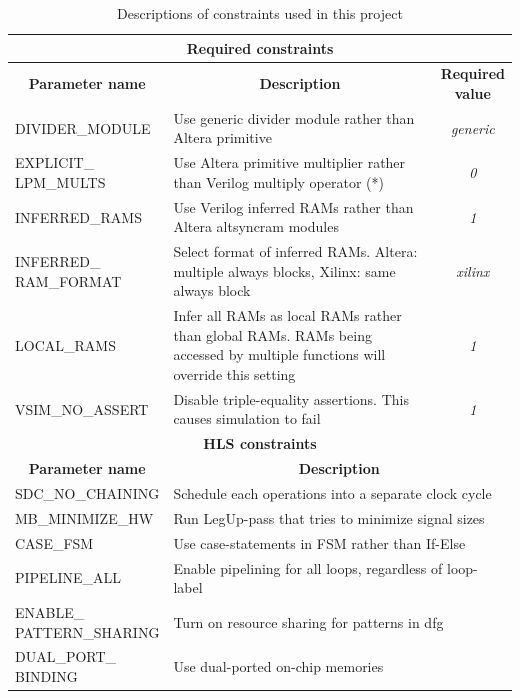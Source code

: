 \begin{table}[hbtp]
    \centering
    \begin{tabular}{l|p{6.4cm}|c}
    \multicolumn{3}{c}{\textbf{Required constraints}} \\
    \toprule
    \multicolumn{1}{c}{\textbf{Parameter name}} & \multicolumn{1}{c}{\textbf{Description}} & \specialcell{\textbf{Required}\\\textbf{value}} \\
    \midrule
    \small{DIVIDER\_MODULE} & Use generic divider module rather than Altera primitive & \textit{generic} \\
    \hline
    \specialcelll{\small{EXPLICIT\_}\\\small{LPM\_MULTS}} & Use Altera primitive multiplier rather than Verilog multiply operator (*) & \textit{0} \\
    \hline
    \small{INFERRED\_RAMS} & Use Verilog inferred RAMs rather than Altera altsyncram modules & \textit{1} \\
    \hline
    \specialcelll[t]{\small{INFERRED\_}\\\small{RAM\_FORMAT}} & Select format of inferred RAMs. Altera: multiple always blocks, Xilinx: same always block & \textit{xilinx} \\
    \hline
    \small{LOCAL\_RAMS} & Infer all RAMs as local RAMs rather than global RAMs. RAMs being accessed by multiple functions will override this setting & \textit{1} \\
    \hline
    \small{VSIM\_NO\_ASSERT} & Disable triple-equality assertions. This causes simulation to fail & \textit{1} \\
    \midrule
    \multicolumn{3}{c}{\textbf{HLS constraints}} \\
    \toprule
    \multicolumn{1}{c}{\textbf{Parameter name}} & \multicolumn{2}{c}{\textbf{Description}} \\
    \midrule
    \small{SDC\_NO\_CHAINING} & \multicolumn{2}{p{8cm}}{Schedule each operations into a separate clock cycle} \\
    \hline
    \small{MB\_MINIMIZE\_HW} & \multicolumn{2}{p{8cm}}{Run LegUp-pass that tries to minimize signal sizes} \\
    \hline
    \small{CASE\_FSM} & \multicolumn{2}{p{8cm}}{Use case-statements in FSM rather than If-Else} \\
    \hline
    \small{PIPELINE\_ALL} & \multicolumn{2}{p{8cm}}{Enable pipelining for all loops, regardless of loop-label} \\
    \hline
    \specialcelll{\small{ENABLE\_}\\\small{PATTERN\_SHARING}} & \multicolumn{2}{p{8cm}}{Turn on resource sharing for patterns in \gls{dfg}} \\
    \hline
    \specialcelll{\small{DUAL\_PORT\_}\\\small{BINDING}} & \multicolumn{2}{p{8cm}}{Use dual-ported on-chip memories} \\
    \bottomrule
    \end{tabular}
    \caption{Descriptions of constraints used in this project}
    \label{tab:constraintssescription}
\end{table}

